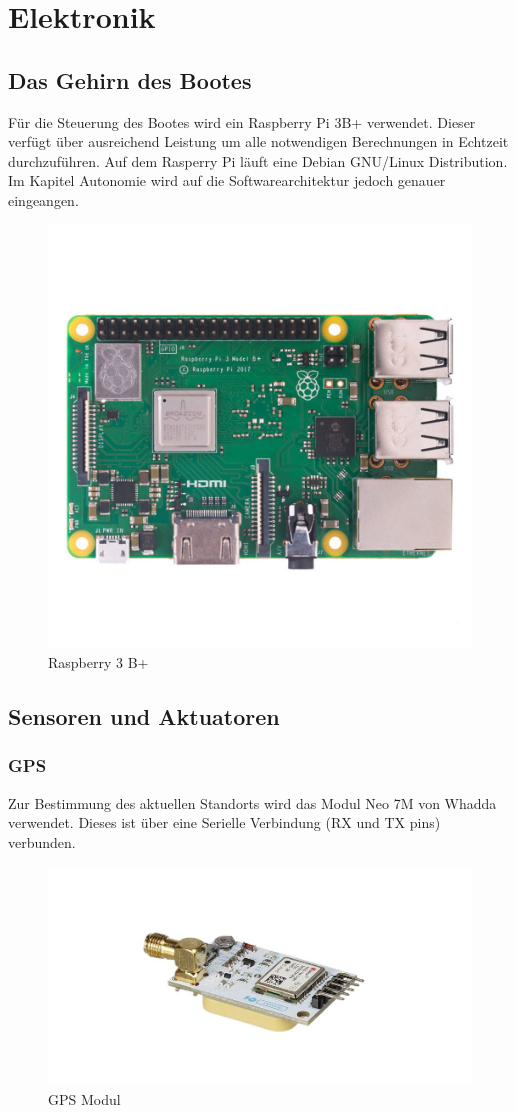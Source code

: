 

\chapter{Elektronik}
\label{chap:elektronik}

\section{Das Gehirn des Bootes}
Für die Steuerung des Bootes wird ein Raspberry Pi 3B+ verwendet. Dieser verfügt über ausreichend Leistung um alle notwendigen Berechnungen in Echtzeit durchzuführen. Auf dem Rasperry Pi läuft eine Debian GNU/Linux Distribution. Im Kapitel Autonomie wird auf die Softwarearchitektur jedoch genauer eingeangen.

\begin{figure}[H] 
  \centering
    \includegraphics[width=0.5\linewidth]{PI_3B-plus-1-0.jpg}
    \caption{Raspberry 3 B+}
    \label{fig:rp3b+}
\end{figure}




\section{Sensoren und Aktuatoren}
\subsection{GPS}
Zur Bestimmung des aktuellen Standorts wird das Modul Neo 7M von Whadda verwendet. Dieses ist über eine Serielle Verbindung (RX und TX pins) verbunden.
\begin{figure}[H] 
    \centering
    \includegraphics[width=0.5\linewidth]{gps.png}
    \caption{GPS Modul}
    \label{fig:gps}
\end{figure}

